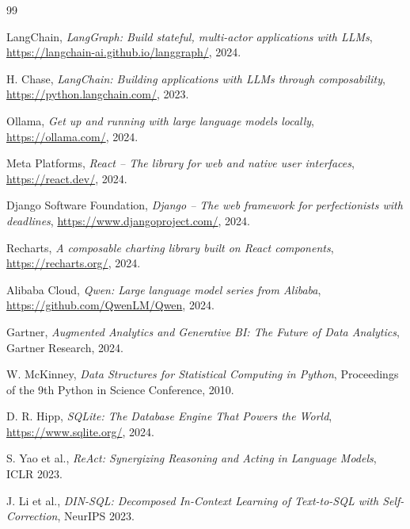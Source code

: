 \begin{thebibliography}{99}

LangChain, \textit{LangGraph: Build stateful, multi-actor applications with LLMs}, \url{https://langchain-ai.github.io/langgraph/}, 2024.

H. Chase, \textit{LangChain: Building applications with LLMs through composability}, \url{https://python.langchain.com/}, 2023.

Ollama, \textit{Get up and running with large language models locally}, \url{https://ollama.com/}, 2024.

Meta Platforms, \textit{React -- The library for web and native user interfaces}, \url{https://react.dev/}, 2024.

Django Software Foundation, \textit{Django -- The web framework for perfectionists with deadlines}, \url{https://www.djangoproject.com/}, 2024.

Recharts, \textit{A composable charting library built on React components}, \url{https://recharts.org/}, 2024.

Alibaba Cloud, \textit{Qwen: Large language model series from Alibaba}, \url{https://github.com/QwenLM/Qwen}, 2024.

Gartner, \textit{Augmented Analytics and Generative BI: The Future of Data Analytics}, Gartner Research, 2024.

W. McKinney, \textit{Data Structures for Statistical Computing in Python}, Proceedings of the 9th Python in Science Conference, 2010.

D. R. Hipp, \textit{SQLite: The Database Engine That Powers the World}, \url{https://www.sqlite.org/}, 2024.

S. Yao et al., \textit{ReAct: Synergizing Reasoning and Acting in Language Models}, ICLR 2023.

J. Li et al., \textit{DIN-SQL: Decomposed In-Context Learning of Text-to-SQL with Self-Correction}, NeurIPS 2023.

\end{thebibliography}

